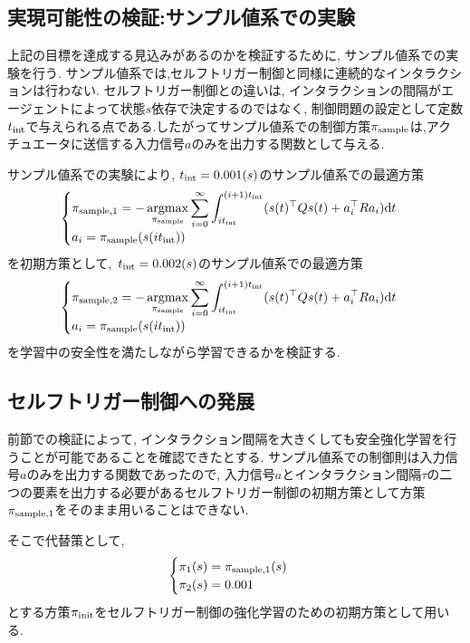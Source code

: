 \documentclass{jsarticle}
\newcommand{\argmax}{\mathop{\rm argmax}\limits}
\begin{document}
\subsection{実現可能性の検証:サンプル値系での実験}
上記の目標を達成する見込みがあるのかを検証するために, サンプル値系での実験を行う. サンプル値系では,セルフトリガー制御と同様に連続的なインタラクションは行わない. セルフトリガー制御との違いは, インタラクションの間隔がエージェントによって状態$s$依存で決定するのではなく, 制御問題の設定として定数$t_{\rm{int}}$で与えられる点である.したがってサンプル値系での制御方策$\pi_{\rm{sample}}$は,アクチュエータに送信する入力信号$a$のみを出力する関数として与える.\par
サンプル値系での実験により, $t_{\rm{int}}=0.001(s)$のサンプル値系での最適方策
\begin{align}
\begin{cases}
	\pi_{\rm{sample},1} = -\argmax_{\pi_{\rm{sample}}} \displaystyle\sum_{i=0}^{\infty} \int_{it_{\rm{int}}}^{(i+1)t_{\rm{int}}}(s(t)^{\top}Qs(t)+a_i^{\top}Ra_i)\textrm{d}t \\
	a_i  = \pi_{\rm{sample}}(s(it_{\rm{int}}))
\end{cases}
\end{align}
を初期方策として,~$t_{\rm{int}}=0.002(s)$のサンプル値系での最適方策
\begin{align}
\begin{cases}
	\pi_{\rm{sample},2} = -\argmax_{\pi_{\rm{sample}}} \displaystyle\sum_{i=0}^{\infty} \int_{it_{\rm{int}}}^{(i+1)t_{\rm{int}}}(s(t)^{\top}Qs(t)+a_i^{\top}Ra_i)\textrm{d}t \\
	a_i  = \pi_{\rm{sample}}(s(it_{\rm{int}}))
\end{cases}
\end{align}
 を学習中の安全性を満たしながら学習できるかを検証する. 

\subsection{セルフトリガー制御への発展}
前節での検証によって, インタラクション間隔を大きくしても安全強化学習を行うことが可能であることを確認できたとする. サンプル値系での制御則は入力信号$a$のみを出力する関数であったので, 入力信号$a$とインタラクション間隔$\tau$の二つの要素を出力する必要があるセルフトリガー制御の初期方策として方策$\pi_{\rm{sample},1}$をそのまま用いることはできない. \par
そこで代替策として,
\begin{align}
\begin{cases}
	\pi_1(s)=\pi_{\rm{sample},1}(s)\\
	\pi_2(s)=0.001
\end{cases}
\end{align}
とする方策$\pi_{\rm{init}}$をセルフトリガー制御の強化学習のための初期方策として用いる.
\end{document}
